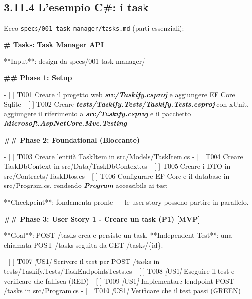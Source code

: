 \documentclass[
  italian,
  10pt,
]{book}
\newenvironment{Shaded}{\begin{snugshade}}{\end{snugshade}}
\newcommand{\CommentTok}[1]{\textcolor[rgb]{0.56,0.35,0.01}{\textit{#1}}}
\newcommand{\FunctionTok}[1]{\textcolor[rgb]{0.13,0.29,0.53}{\textbf{#1}}}
\newcommand{\InformationTok}[1]{\textcolor[rgb]{0.56,0.35,0.01}{\textbf{\textit{#1}}}}
\newcommand{\NormalTok}[1]{#1}
\newcommand{\OtherTok}[1]{\textcolor[rgb]{0.56,0.35,0.01}{#1}}
\newcommand{\SpecialStringTok}[1]{\textcolor[rgb]{0.31,0.60,0.02}{#1}}
\newcommand{\VariableTok}[1]{\textcolor[rgb]{0.00,0.00,0.00}{#1}}
\begin{document}
\subsection{3.11.4 L'esempio C\#: i task}\label{lesempio-c-i-task}

Ecco \texttt{specs/001-task-manager/tasks.md} (parti essenziali):

\begin{Shaded}
\begin{Highlighting}[]
\FunctionTok{\# Tasks: Task Manager API}

\NormalTok{**Input**: design da specs/001{-}task{-}manager/}

\FunctionTok{\#\# Phase 1: Setup}

\SpecialStringTok{{-} }\VariableTok{[ ]}\NormalTok{ T001 Creare il progetto web }\InformationTok{\textasciigrave{}src/Taskify.csproj\textasciigrave{}}\NormalTok{ e aggiungere EF Core Sqlite}
\SpecialStringTok{{-} }\VariableTok{[ ]}\NormalTok{ T002 Creare }\InformationTok{\textasciigrave{}tests/Taskify.Tests/Taskify.Tests.csproj\textasciigrave{}}\NormalTok{ con xUnit, aggiungere il riferimento a }\InformationTok{\textasciigrave{}src/Taskify.csproj\textasciigrave{}}\NormalTok{ e il pacchetto }\InformationTok{\textasciigrave{}Microsoft.AspNetCore.Mvc.Testing\textasciigrave{}}

\FunctionTok{\#\# Phase 2: Foundational (Bloccante)}

\SpecialStringTok{{-} }\VariableTok{[ ]}\NormalTok{ T003 Creare l\textquotesingle{}entità TaskItem in src/Models/TaskItem.cs}
\SpecialStringTok{{-} }\VariableTok{[ ]}\NormalTok{ T004 Creare TaskDbContext in src/Data/TaskDbContext.cs}
\SpecialStringTok{{-} }\VariableTok{[ ]}\NormalTok{ T005 Creare i DTO in src/Contracts/TaskDtos.cs}
\SpecialStringTok{{-} }\VariableTok{[ ]}\NormalTok{ T006 Configurare EF Core e il database in src/Program.cs, rendendo }\InformationTok{\textasciigrave{}Program\textasciigrave{}}\NormalTok{ accessibile ai test}

\NormalTok{**Checkpoint**: fondamenta pronte — le user story possono partire in parallelo.}

\FunctionTok{\#\# Phase 3: User Story 1 {-} Creare un task (P1) [MVP]}

\NormalTok{**Goal**: POST /tasks crea e persiste un task.}
\NormalTok{**Independent Test**: una chiamata POST /tasks seguita da GET /tasks/\{id\}.}

\SpecialStringTok{{-} }\VariableTok{[ ]}\NormalTok{ T007 }\CommentTok{[}\OtherTok{US1}\CommentTok{]}\NormalTok{ Scrivere il test per POST /tasks in tests/Taskify.Tests/TaskEndpointsTests.cs}
\SpecialStringTok{{-} }\VariableTok{[ ]}\NormalTok{ T008 }\CommentTok{[}\OtherTok{US1}\CommentTok{]}\NormalTok{ Eseguire il test e verificare che fallisca (RED)}
\SpecialStringTok{{-} }\VariableTok{[ ]}\NormalTok{ T009 }\CommentTok{[}\OtherTok{US1}\CommentTok{]}\NormalTok{ Implementare l\textquotesingle{}endpoint POST /tasks in src/Program.cs}
\SpecialStringTok{{-} }\VariableTok{[ ]}\NormalTok{ T010 }\CommentTok{[}\OtherTok{US1}\CommentTok{]}\NormalTok{ Verificare che il test passi (GREEN)}


\end{Highlighting}
\end{Shaded}
\end{document}
